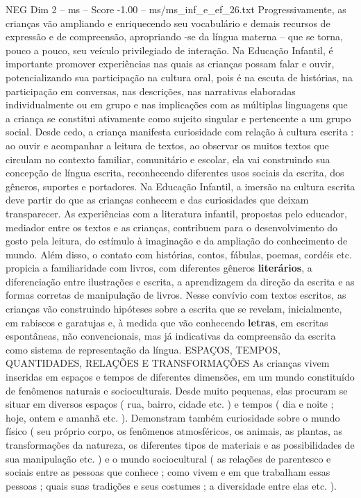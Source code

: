 \begin{textsample}{NEG Dim 2 – ms – Score -1.00 – ms/ms\_inf\_e\_ef\_26.txt}
Progressivamente, as crianças vão ampliando e enriquecendo seu vocabulário e demais recursos de expressão e de compreensão, apropriando -se da língua materna – que se torna, pouco a pouco, seu veículo privilegiado de interação.
Na Educação Infantil, é importante promover experiências nas quais as crianças possam falar e ouvir, potencializando sua participação na cultura oral, pois é na escuta de histórias, na participação em conversas, nas descrições, nas narrativas elaboradas individualmente ou em grupo e nas implicações com as múltiplas linguagens que a criança se constitui ativamente como sujeito singular e pertencente a um grupo social.
Desde cedo, a criança manifesta curiosidade com relação à cultura escrita : ao ouvir e acompanhar a leitura de textos, ao observar os muitos textos que circulam no contexto familiar, comunitário e escolar, ela vai construindo sua concepção de língua escrita, reconhecendo diferentes usos sociais da escrita, dos gêneros, suportes e portadores.
Na Educação Infantil, a imersão na cultura escrita deve partir do que as crianças conhecem e das curiosidades que deixam transparecer.
As experiências com a literatura infantil, propostas pelo educador, mediador entre os textos e as crianças, contribuem para o desenvolvimento do gosto pela leitura, do estímulo à imaginação e da ampliação do conhecimento de mundo.
Além disso, o contato com histórias, contos, fábulas, poemas, cordéis etc. propicia a familiaridade com livros, com diferentes gêneros \textbf{literários}, a diferenciação entre ilustrações e escrita, a aprendizagem da direção da escrita e as formas corretas de manipulação de livros.
Nesse convívio com textos escritos, as crianças vão construindo hipóteses sobre a escrita que se revelam, inicialmente, em rabiscos e garatujas e, à medida que vão conhecendo \textbf{letras}, em escritas espontâneas, não convencionais, mas já indicativas da compreensão da escrita como sistema de representação da língua.
ESPAÇOS, TEMPOS, QUANTIDADES, RELAÇÕES E TRANSFORMAÇÕES As crianças vivem inseridas em espaços e tempos de diferentes dimensões, em um mundo constituído de fenômenos naturais e socioculturais.
Desde muito pequenas, elas procuram se situar em diversos espaços ( rua, bairro, cidade etc. ) e tempos ( dia e noite ; hoje, ontem e amanhã etc. ).
Demonstram também curiosidade sobre o mundo físico ( seu próprio corpo, os fenômenos atmosféricos, os animais, as plantas, as transformações da natureza, os diferentes tipos de materiais e as possibilidades de sua manipulação etc. ) e o mundo sociocultural ( as relações de parentesco e sociais entre as pessoas que conhece ; como vivem e em que trabalham essas pessoas ; quais suas tradições e seus costumes ; a diversidade entre elas etc. ).

\end{textsample}
